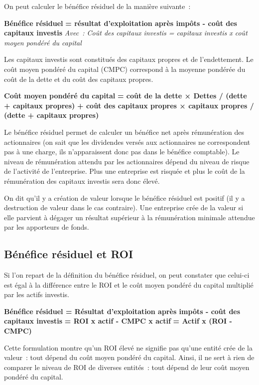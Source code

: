 \documentclass[oneside]{kaobook}
\begin{document}
On peut calculer le bénéfice résiduel de la manière suivante :
\begin{center}
\textbf{Bénéfice résiduel}
\textbf{= résultat d'exploitation après impôts - coût des capitaux investis}
\emph{Avec : Coût des capitaux investis = capitaux investis x coût moyen pondéré du
capital}
\end{center}
Les capitaux investis sont constitués des capitaux propres et de
l'endettement. Le coût moyen pondéré du capital (CMPC) correspond à la moyenne pondérée
du coût de la dette et du coût des capitaux propres.
\begin{center}
\textbf{Coût moyen pondéré du capital} 
\textbf{=  coût de la dette × Dettes / (dette + capitaux propres)} 
\textbf{+ coût des capitaux propres × capitaux propres / (dette + capitaux propres)}
\end{center}

Le bénéfice résiduel permet de calculer un bénéfice net après rémunération des actionnaires (on sait que les dividendes versés aux actionnaires ne correspondent pas à une charge, ils n'apparaissent donc pas dans le bénéfice comptable). Le niveau de rémunération attendu par les actionnaires dépend du niveau de risque de l'activité de l'entreprise. Plus une entreprise est risquée et plus le coût de la rémunération des capitaux investis sera donc élevé.

On dit qu'il y a création de valeur lorsque le bénéfice résiduel est positif (il y a destruction de valeur dans le cas contraire). Une entreprise crée de la valeur si elle parvient à dégager un résultat supérieur à la rémunération minimale attendue par les apporteurs de fonds.

\subsection{Bénéfice résiduel et ROI}
\label{sec:orgca91adc}
Si l'on repart de la définition du bénéfice résiduel, on peut constater que celui-ci est égal à la différence entre le ROI et le coût moyen pondéré du capital multiplié par les actifs investis. 

\begin{center}
\textbf{Bénéfice résiduel = Résultat d'exploitation après impôts - coût des
capitaux investis}
\textbf{= ROI x actif - CMPC x actif}
\textbf{= Actif x (ROI - CMPC)}
\end{center}

Cette formulation montre qu'un ROI élevé ne signifie pas qu'une entité crée de la valeur : tout dépend du coût moyen pondéré du capital. Ainsi, il ne sert à rien de comparer le niveau de ROI de diverses entités : tout dépend de leur coût moyen pondéré du capital. 
\end{document}

